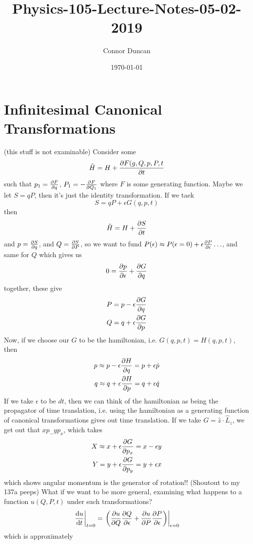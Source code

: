 \documentclass{article} \usepackage{amsmath} \usepackage{amssymb} \usepackage{amsthm} \usepackage[margin=0.2in]{geometry} \usepackage{hyperref} \usepackage{physics} \usepackage{tikz} \usepackage{mathtools} \mathtoolsset{showonlyrefs} \theoremstyle{definition} \newtheorem{theorem}{Theorem}[section] \newtheorem{corollary}{Corollary}[theorem] \newtheorem{lemma}[theorem]{Lemma} \newtheorem{definition}{Definition}[section] \author{Connor Duncan} \date{\today}
\title{Physics-105-Lecture-Notes-05-02-2019}
\begin{document}
\maketitle\tableofcontents
\noindent{}
\section{Infinitesimal Canonical Transformations} (this stuff is not examinable) Consider some \begin{equation} \tilde H=H+\pdv{F(g,Q,p,P,t}{t} \end{equation} such that $p_1=\pdv{F}{q}$, $P_1=-\pdv{F}{Q_1}$ where $F$ is some generating function. Maybe we let $S=qP$, then it's just the identity transformation. If we taek \begin{equation} S=qP+\epsilon G(q,p,t) \end{equation} then \begin{equation} \tilde H=H+\pdv{S}{t} \end{equation} and $p=\pdv{S}{q}(q,P,t)$, and $Q=\pdv{S}{P}$, so we want to fund $P(\epsilon)\approx P(\epsilon=0)+\epsilon\pdv{P}{\epsilon}\ldots$, and same for $Q$ which gives us \begin{equation} 0=\pdv{p}{\epsilon}+\pdv{G}{q} \end{equation} together, these give \begin{align} P=p-\epsilon\pdv{G}{q}\\ Q=q+\epsilon\pdv{G}{p} \end{align} Now, if we choose our $G$ to be the hamiltonian, i.e. $G(q,p,t)=H(q,p,t)$, then \begin{align} p\approx p-\epsilon\pdv{H}{q}=p+\epsilon\dot p \\ q\approx q+\epsilon\pdv{H}{p}=q+\epsilon\dot q \end{align} If we take $\epsilon$ to be $dt$, then we can think of the hamiltonian as being the propagator of time translation, i.e. using the hamiltonian as a generating function of canonical transformations gives out time translation. If we take $G=\hat z\cdot\hat L_z$, we get out that $xp_-yp_x$, which takes \begin{align} X\approx x+\epsilon\pdv{G}{p_x}=x-\epsilon y\\ Y=y+\epsilon\pdv{G}{p_y}=y+\epsilon x \end{align} which shows angular momentum is the generator of rotation!! (Shoutout to my 137a peeps) What if we want to be more general, examining what happens to a function $u(Q,P,t)$ under such transformations? \begin{equation} \left.\dv{u}{t}\right|_{t=0}=\left.\left(\pdv{u}{Q}\pdv{Q}{\epsilon}+\pdv{u}{P}\pdv{P}{\epsilon}\right)\right|_{\epsilon=0} \end{equation} which is approximately 
\end{document}
